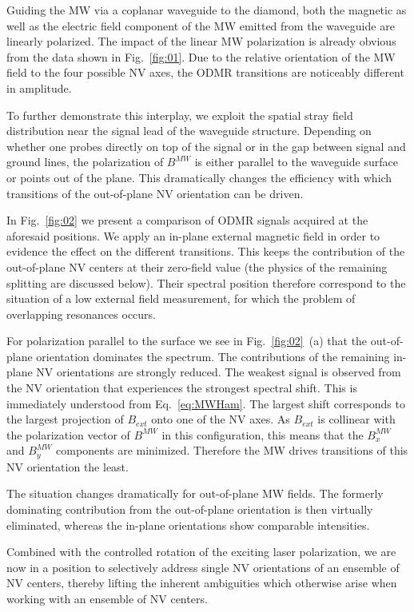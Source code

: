 \documentclass[
 reprint,
 amsmath,
 amssymb,
aps,
 prb,
showpacs
]{revtex4-1}
\begin{document}
Guiding the MW via a coplanar waveguide to the diamond, both the magnetic as well as the electric field component of the MW emitted from the waveguide are linearly polarized. The impact of the linear MW polarization is already obvious from the data shown in  Fig.~\ref{fig:01}. Due to the relative orientation of the MW field to the four possible NV axes, the ODMR transitions are noticeably different in amplitude.

To further demonstrate this interplay, we exploit the spatial stray field distribution near the signal lead of the waveguide structure. Depending on whether one probes directly on top of the signal or in the gap between signal and ground lines, the polarization of $B^{MW}$ is either parallel to the waveguide surface or points out of the plane. This dramatically changes the efficiency with which transitions of the out-of-plane NV orientation can be driven.

In Fig.~\ref{fig:02} we present a comparison of ODMR signals acquired at the aforesaid positions. We apply an in-plane external magnetic field in order to evidence the effect on the different transitions. This keeps the contribution of the out-of-plane NV centers at their zero-field value (the physics of the remaining splitting are discussed below). Their spectral position therefore correspond to the situation of a low external field measurement, for which the problem of overlapping resonances occurs.

For polarization parallel to the surface we see in Fig.~\ref{fig:02}~(a) that the out-of-plane orientation dominates the spectrum. The contributions of the remaining in-plane NV orientations are strongly reduced. The weakest signal is observed from the NV orientation that experiences the strongest spectral shift. This is immediately understood from Eq.~\ref{eq:MWHam}. The largest shift corresponds to the largest projection of $B_{ext}$ onto one of the NV axes. As $B_{ext}$ is collinear with the polarization vector of $B^{MW}$ in this configuration, this means that the $B^{MW}_x$ and $B^{MW}_y$ components are minimized. Therefore the MW drives transitions of this NV orientation the least.

The situation changes dramatically for out-of-plane MW fields. The formerly dominating contribution from the  out-of-plane orientation is then virtually eliminated, whereas the in-plane orientations show comparable intensities. 

Combined with the controlled rotation of the exciting laser polarization, we are now in a position to selectively address single NV orientations of an ensemble of NV centers, thereby lifting the inherent ambiguities which otherwise arise when working with an ensemble of NV centers.
\end{document}
